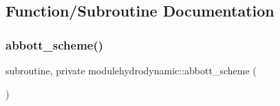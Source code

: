 \subsection{Function/\+Subroutine Documentation}
\mbox{\label{namespacemodulehydrodynamic_ab24f3a1aadd0e5ea548005ab690517a5}} 
\subsubsection{\texorpdfstring{abbott\+\_\+scheme()}{abbott\_scheme()}}
{\footnotesize\ttfamily subroutine, private modulehydrodynamic\+::abbott\+\_\+scheme (\begin{DoxyParamCaption}{ }\end{DoxyParamCaption})\hspace{0.3cm}{\ttfamily [private]}}

